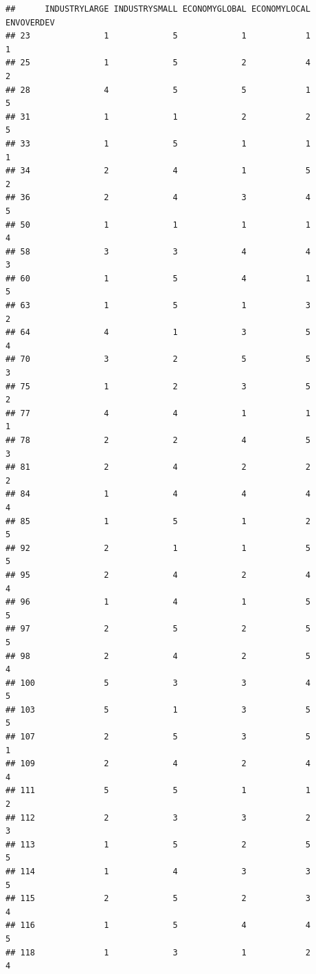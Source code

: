 \documentclass[
]{article}
\begin{document}
\begin{verbatim}
##      INDUSTRYLARGE INDUSTRYSMALL ECONOMYGLOBAL ECONOMYLOCAL ENVOVERDEV
## 23               1             5             1            1          1
## 25               1             5             2            4          2
## 28               4             5             5            1          5
## 31               1             1             2            2          5
## 33               1             5             1            1          1
## 34               2             4             1            5          2
## 36               2             4             3            4          5
## 50               1             1             1            1          4
## 58               3             3             4            4          3
## 60               1             5             4            1          5
## 63               1             5             1            3          2
## 64               4             1             3            5          4
## 70               3             2             5            5          3
## 75               1             2             3            5          2
## 77               4             4             1            1          1
## 78               2             2             4            5          3
## 81               2             4             2            2          2
## 84               1             4             4            4          4
## 85               1             5             1            2          5
## 92               2             1             1            5          5
## 95               2             4             2            4          4
## 96               1             4             1            5          5
## 97               2             5             2            5          5
## 98               2             4             2            5          4
## 100              5             3             3            4          5
## 103              5             1             3            5          5
## 107              2             5             3            5          1
## 109              2             4             2            4          4
## 111              5             5             1            1          2
## 112              2             3             3            2          3
## 113              1             5             2            5          5
## 114              1             4             3            3          5
## 115              2             5             2            3          4
## 116              1             5             4            4          5
## 118              1             3             1            2          4

\end{verbatim}
\end{document}
